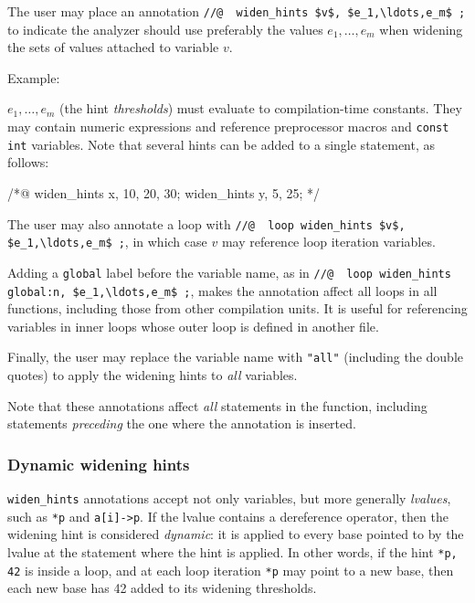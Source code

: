 \documentclass{frama-c-book}
\begin{document}
The user may place an annotation \lstinline|//@  widen_hints $v$, $e_1,\ldots,e_m$ ;|
to indicate the analyzer should use preferably the values $e_1,\ldots,e_m$
when widening the sets of values attached to variable $v$.

Example:

$e_1,\ldots,e_m$ (the hint \emph{thresholds}) must evaluate to compilation-time
constants. They may contain numeric expressions and reference preprocessor
macros and \lstinline|const int| variables.
Note that several hints can be added to a single statement, as follows:

\begin{listing-nonumber}
  /*@ widen_hints x, 10, 20, 30;
      widen_hints y, 5, 25; */
\end{listing-nonumber}

The user may also annotate a loop with
\lstinline|//@  loop widen_hints $v$, $e_1,\ldots,e_m$ ;|,
in which case $v$ may reference loop iteration variables.

Adding a \lstinline|global| label before the variable name, as in
\lstinline|//@  loop widen_hints global:n, $e_1,\ldots,e_m$ ;|,
makes the annotation affect all loops in all functions, including
those from other compilation units. It is useful for referencing variables
in inner loops whose outer loop is defined in another file.

Finally, the user may replace the variable name with \lstinline|"all"|
(including the double quotes) to apply the widening hints to {\em all} variables.

Note that these annotations affect {\em all} statements in the function,
including statements {\em preceding} the one where the annotation is inserted.

\subsubsection*{Dynamic widening hints}

\lstinline|widen_hints| annotations accept not only variables, but more
generally \emph{lvalues}, such as \lstinline|*p| and \lstinline|a[i]->p|.
If the lvalue contains a dereference operator, then the widening hint is
considered \emph{dynamic}: it is applied to every base pointed to by the lvalue
at the statement where the hint is applied. In other words, if the hint
\lstinline|*p, 42| is inside a loop, and at each loop iteration \lstinline|*p|
may point to a new base, then each new base has 42 added to its widening
thresholds.
\end{document}
